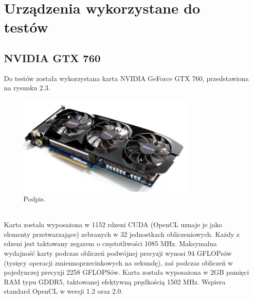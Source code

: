 \section{Urządzenia wykorzystane do testów}
\subsection{NVIDIA GTX 760}
Do testów została wykorzystana karta NVIDIA GeForce GTX 760, przedstawiona na rysunku 2.3. \\
\begin{figure}[h]
\centering
\includegraphics[width=0.8\textwidth]{figures/gtx.png}
\caption{Podpis.}%
\label{rys:etykieta}
\end{figure} \\
Karta została wyposażona w 1152 rdzeni CUDA (OpenCL uznaje je jako elementy przetwarzające) zebranych w 32 jednostkach obliczeniowych. Każdy z rdzeni jest taktowany zegarem o częstotliwości 1085 MHz. Maksymalna wydajność karty podczas obliczeń podwójnej precyzji wynosi 94 GFLOPsów (tysięcy operacji zmiennoprzecinkowych na sekundę), zaś podczas obliczeń w pojedynczej precyzji 2258 GFLOPSów. Karta została wyposażona w 2GB pamięci RAM typu GDDR5, taktowanej efektywną prędkością 1502 MHz. Wspiera standard OpenCL w wersji 1.2 oraz 2.0.

